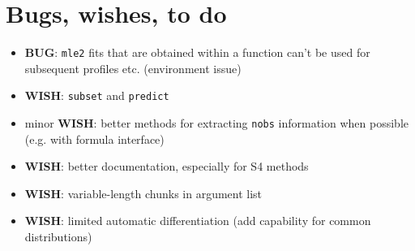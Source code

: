 \documentclass{article}
\newcommand{\code}[1]{{\tt #1}}
\begin{document}
\section*{Bugs, wishes, to do}
\begin{itemize}
\item \textbf{BUG}: \code{mle2} fits that are obtained within a function
  can't be used for subsequent profiles etc. (environment issue)
\item \textbf{WISH}: \code{subset} and \code{predict}
\item minor \textbf{WISH}: 
  better methods for extracting \code{nobs} information
  when possible (e.g. with formula interface)
\item \textbf{WISH}: better documentation, especially for S4 methods
\item \textbf{WISH}: variable-length chunks in argument list
\item \textbf{WISH}: limited automatic differentiation
    (add capability for common distributions)
\end{itemize}


\end{document}
